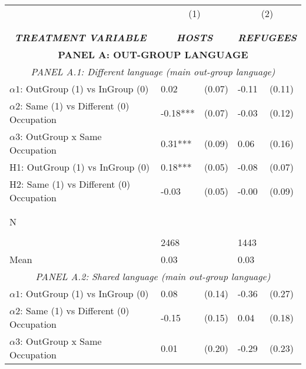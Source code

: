 \begin{tabular}{l*{4}{l}} \toprule 
                &\multicolumn{2}{c}{(1)}&\multicolumn{2}{c}{(2)}\\
                &\multicolumn{2}{c}{ } &\multicolumn{2}{c}{ } \\
\\[-0.6cm] \multicolumn{1}{c}{\textit{\textbf{TREATMENT VARIABLE}}} & \multicolumn{2}{c}{\textit{\textbf{HOSTS}}} & \multicolumn{2}{c}{\textit{\textbf{REFUGEES}}} \\ \midrule   \multicolumn{5}{c}{\textbf{PANEL A: OUT-GROUP LANGUAGE}} \\ \multicolumn{5}{c}{\textit{PANEL A.1: Different language (main out-group language)}} \\  \midrule  
$\alpha1$: OutGroup (1) vs InGroup (0)&     0.02   &   (0.07)&    -0.11   &   (0.11)\\
$\alpha2$: Same (1) vs Different (0) Occupation&    -0.18***&   (0.07)&    -0.03   &   (0.12)\\
 
$\alpha3$: OutGroup x Same Occupation&     0.31***&   (0.09)&     0.06   &   (0.16)\\
 
H1: OutGroup (1) vs InGroup (0)&     0.18***&   (0.05)&    -0.08   &   (0.07)\\
 
H2: Same (1) vs Different (0) Occupation&    -0.03   &   (0.05)&    -0.00   &   (0.09)\\
 
  \\\\[-0.5cm] N \\\\[-0.6cm]&     2468   &         &     1443   &         \\
Mean            &     0.03&         &     0.03&         \\
 
  \multicolumn{5}{c}{\textit{PANEL A.2: Shared language (main out-group language)}} \\  \midrule  
$\alpha1$: OutGroup (1) vs InGroup (0)&        0.08   &      (0.14)&       -0.36   &      (0.27)\\
$\alpha2$: Same (1) vs Different (0) Occupation&       -0.15   &      (0.15)&        0.04   &      (0.18)\\
 
$\alpha3$: OutGroup x Same Occupation&     0.01   &   (0.20)&    -0.29   &   (0.23)\\
 

\end{tabular}
